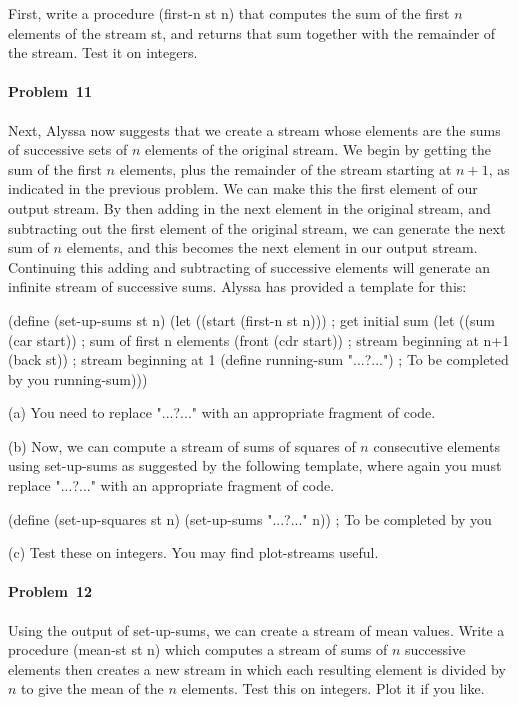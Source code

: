 First, write a procedure {\cf (first-n st n)} that computes the sum of the
first $n$ elements of the stream {\cf st}, and returns that sum together
with the remainder of the stream. Test it on {\cf integers}.


\paragraph{Problem~11} Next, Alyssa now suggests that we create
a stream whose elements are the sums of successive sets of $n$ elements
of the original stream.  We begin by getting the sum of the first $n$
elements, plus the remainder of the stream starting at $n+1$, as
indicated in the previous problem.  We can make this the first element of our
output stream.  By then adding in the next element in the
original stream, and subtracting out the first element of the original
stream, we can generate the next sum of $n$ elements, and this becomes
the next element in our output stream.  Continuing this
adding and subtracting of successive elements will generate an infinite
stream of successive sums.  Alyssa has provided a template for this:

\beginlisp 
(define (set-up-sums st n)
  (let ((start (first-n st n)))  ; get initial sum
    (let ((sum   (car start))    ; sum of first n elements
          (front (cdr start))    ; stream beginning at n+1
          (back st))             ; stream beginning at 1
     (define running-sum "...?...")  ; To be completed by you
     running-sum)))
\endlisp

(a) You need to replace {\cf "...?..."} with an appropriate fragment
of code.

(b) Now, we can compute a stream of sums of squares of $n$ consecutive
elements using {\cf set-up-sums} as suggested by the following template, where
again you must replace {\cf "...?..."} with an appropriate fragment of code.

\beginlisp
(define (set-up-squares st n)
  (set-up-sums "...?..." n))   ; To be completed by you
\endlisp

(c) Test these on {\cf integers}. You may find {\cf plot-streams} useful.


\paragraph{Problem~12}  Using the output of {\cf set-up-sums}, we can create
a stream of mean values.  Write a procedure {\cf (mean-st st n)} which
computes a stream of sums of $n$ successive elements then creates a
new stream in which each resulting element is divided by $n$ to give
the mean of the $n$ elements. Test this on {\cf integers}. Plot it if you like.


